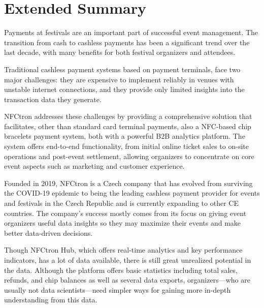 \chapter*{Extended Summary}
\label{ch:extended-summary}
Payments at festivals are an important part of successful event management.
The transition from cash to cashless payments has been a significant trend over the last decade, with many benefits for both festival organizers and attendees.

Traditional cashless payment systems based on payment terminals, face two major challenges: they are expensive to implement reliably in venues with unstable internet connections, and they provide only limited insights into the transaction data they generate.

NFCtron addresses these challenges by providing a comprehensive solution that facilitates, other than standard card terminal payments, also a NFC-based chip bracelets payment system, both with a powerful B2B analytics platform.
The system offers end-to-end functionality, from initial online ticket sales to on-site operations and post-event settlement, allowing organizers to concentrate on core event aspects such as marketing and customer experience.

Founded in 2019, NFCtron is a Czech company that has evolved from surviving the COVID-19 epidemic to being the leading cashless payment provider for events and festivals in the Czech Republic and is currently expanding to other CE countries.
The company's success mostly comes from its focus on giving event organizers useful data insights so they may maximize their events and make better data-driven decisions.

Though NFCtron Hub, which offers real-time analytics and key performance indicators, has a lot of data available, there is still great unrealized potential in the data.
Although the platform offers basic statistics including total sales, refunds, and chip balances as well as several data exports, organizers—who are usually not data scientists—need simpler ways for gaining more in-depth understanding from this data.

